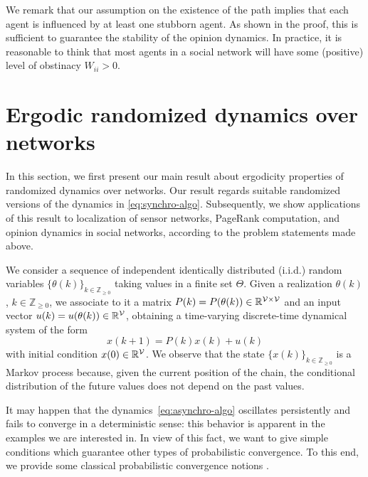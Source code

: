 \documentclass{IEEEtran}
\newcommand{\real}{\mathbb{R}}
\newcommand{\integernonnegative}{\mathbb{Z}_{\ge 0}}
\newcommand{\1}{\mathbf{1}} \newcommand{\ind}{\mathds{1}}
\begin{document}
We remark that our assumption on the existence of the path implies that each agent is influenced by at least one stubborn agent.
As shown in the proof, this is sufficient to guarantee the stability of the opinion dynamics.
In practice, it is reasonable to think that most agents in a social network will have some (positive) level of obstinacy $W_{ii}>0$.



\section{Ergodic randomized dynamics over networks}\label{sect:randomized}



In this section, we first present our main result about ergodicity properties of randomized dynamics over networks. Our result regards suitable randomized versions of the dynamics in \eqref{eq:synchro-algo}. 
Subsequently, we show applications of this result to localization of sensor networks, PageRank computation, and opinion dynamics in social networks, according to the problem statements made above.

We consider a sequence of independent identically distributed (i.i.d.) random variables $\{\theta(k)\}_{k\in\integernonnegative}$ taking values in a finite set $\Theta$.
Given a realization $\theta(k)$, $k\in\integernonnegative$, we associate to it a matrix $P(k)=P({\theta(k)})\in\real^{\V\times \V}$ and an input vector $u(k)=u(\theta(k))\in\real^\V$, obtaining a time-varying discrete-time dynamical system of the form
\begin{equation}
\label{eq:asynchro-algo}
 x(k+1)=P(k) x(k)+u(k)
\end{equation}
with initial condition $x(0) \in \real^\V $.
We observe that the state $\{x(k)\}_{k\in\integernonnegative}$ is a Markov process because, given the current position of the chain, the conditional distribution of the future values does not depend on the past values.

It may happen that the dynamics~\eqref{eq:asynchro-algo} oscillates persistently and fails to converge in a deterministic sense: this behavior is  apparent in the examples we are interested in.
In view of this fact, we want to give simple conditions which guarantee other types of probabilistic convergence. To this end, we provide some classical probabilistic convergence notions \cite{VB:95}.
\end{document}
